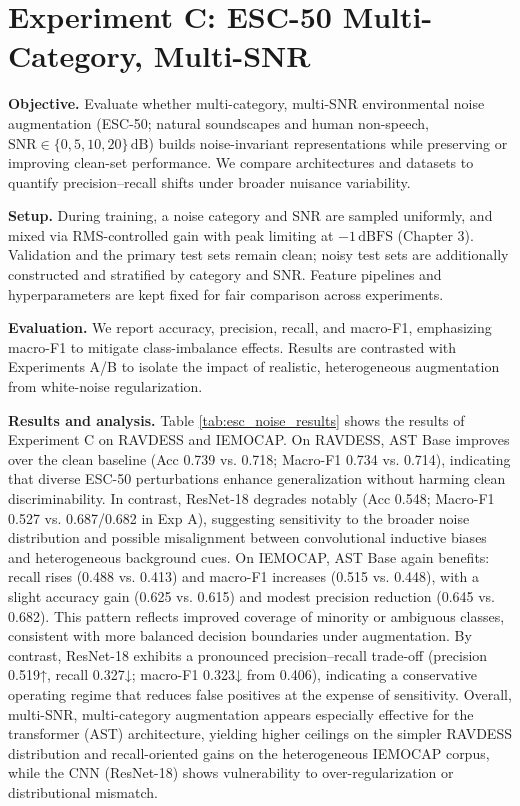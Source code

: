 \section{Experiment C: ESC-50 Multi-Category, Multi-SNR}
\textbf{Objective.} Evaluate whether multi-category, multi-SNR environmental noise augmentation (ESC-50; natural soundscapes and human non-speech, \(\mathrm{SNR}\in\{0,5,10,20\}\,\mathrm{dB}\)) builds noise-invariant representations while preserving or improving clean-set performance. We compare architectures and datasets to quantify precision–recall shifts under broader nuisance variability.

\textbf{Setup.} During training, a noise category and SNR are sampled uniformly, and mixed via RMS-controlled gain with peak limiting at \(-1\,\mathrm{dBFS}\) (Chapter 3). Validation and the primary test sets remain clean; noisy test sets are additionally constructed and stratified by category and SNR. Feature pipelines and hyperparameters are kept fixed for fair comparison across experiments.

\textbf{Evaluation.} We report accuracy, precision, recall, and macro-F1, emphasizing macro-F1 to mitigate class-imbalance effects. Results are contrasted with Experiments A/B to isolate the impact of realistic, heterogeneous augmentation from white-noise regularization.

\textbf{Results and analysis.} Table \ref{tab:esc_noise_results} shows the results of Experiment C on RAVDESS and IEMOCAP. On RAVDESS, AST Base improves over the clean baseline (Acc 0.739 vs. 0.718; Macro-F1 0.734 vs. 0.714), indicating that diverse ESC-50 perturbations enhance generalization without harming clean discriminability. In contrast, ResNet-18 degrades notably (Acc 0.548; Macro-F1 0.527 vs. 0.687/0.682 in Exp A), suggesting sensitivity to the broader noise distribution and possible misalignment between convolutional inductive biases and heterogeneous background cues. On IEMOCAP, AST Base again benefits: recall rises (0.488 vs. 0.413) and macro-F1 increases (0.515 vs. 0.448), with a slight accuracy gain (0.625 vs. 0.615) and modest precision reduction (0.645 vs. 0.682). This pattern reflects improved coverage of minority or ambiguous classes, consistent with more balanced decision boundaries under augmentation. By contrast, ResNet-18 exhibits a pronounced precision–recall trade-off (precision 0.519↑, recall 0.327↓; macro-F1 0.323↓ from 0.406), indicating a conservative operating regime that reduces false positives at the expense of sensitivity. Overall, multi-SNR, multi-category augmentation appears especially effective for the transformer (AST) architecture, yielding higher ceilings on the simpler RAVDESS distribution and recall-oriented gains on the heterogeneous IEMOCAP corpus, while the CNN (ResNet-18) shows vulnerability to over-regularization or distributional mismatch.

